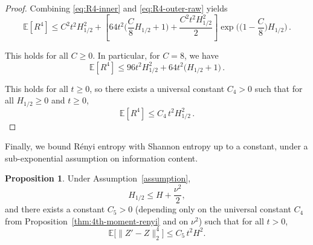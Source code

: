 \documentclass[11pt]{article}
\newcommand{\info}{\imath}         %
\theoremstyle{definition}
\newtheorem{proposition}{Proposition}
\newcommand{\indic}{\mathbf{1}}
\newcommand{\R}{\mathbb{R}}
\numberwithin{equation}{section}
\begin{document}
\begin{proof}

Combining \eqref{eq:R4-inner} and \eqref{eq:R4-outer-raw} yields
\[
\mathbb E[R^4]
\le C^2 t^2 H_{1/2}^2
+ \left[64 t^2\Big(\frac{C}{8}H_{1/2}+1\Big)+ \frac{C^2 t^2 H_{1/2}^2}{2}\right]
\exp\Big(\Big(1-\frac{C}{8}\Big)H_{1/2}\Big)\,.
\]

This holds for all $C\ge 0$. In particular, for $C=8$, we have 
\[
\mathbb E[R^4]
\le 96 t^2 H_{1/2}^2
+ 64 t^2\Big(H_{1/2}+1\Big)\,.
\]

This holds for all $t\ge 0$, so there exists a universal constant $C_4>0$ 
such that for all $H_{1/2}\ge0$ and $t\ge 0$,
\[\mathbb E[R^4]
\le C_4\,t^2 H_{1/2}^2\,.\]
\end{proof}



Finally, we bound R\'enyi entropy with Shannon entropy up to a constant, under a sub-exponential assumption on information content.

\begin{proposition}\label{prop:4th-moment-shannon}
Under Assumption~\ref{assumption}, 
\begin{equation}\label{eq:renyi-vs-shannon}
H_{1/2} \le H + \frac{\nu^2}{2},
\end{equation}
and there exists a constant $C_5>0$ (depending only on
the universal constant $C_4$ from Proposition~\ref{thm:4th-moment-renyi}
and on $\nu^2$) such that for all $t>0$,
\begin{equation}\label{eq:4th-moment-shannon}
\mathbb E\big[\|Z'-Z\|_2^4\big]
\le C_5\,t^2 H^2.
\end{equation}
\end{proposition}
\end{document}
